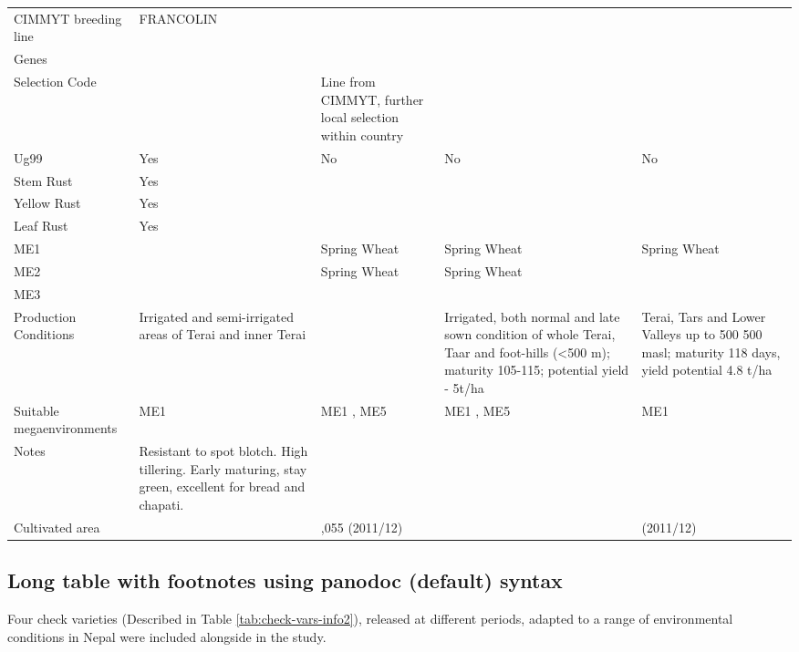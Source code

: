 \documentclass[]{article}
\begin{document}
\begin{longtable}[t]{>{\centering\arraybackslash}p{2.0cm}>{\centering\arraybackslash}p{3.4cm}>{\centering\arraybackslash}p{3.4cm}>{\centering\arraybackslash}p{3.4cm}>{\centering\arraybackslash}p{3.4cm}}
CIMMYT breeding line & FRANCOLIN &  &  & \\
Genes &  &  &  & \\
\addlinespace
Selection Code &  & Line from CIMMYT, further local selection within country &  & \\
Ug99 & Yes & No & No & No\\
Stem Rust & Yes &  &  & \\
Yellow Rust & Yes &  &  & \\
Leaf Rust & Yes &  &  & \\
\addlinespace
ME1 &  & Spring Wheat & Spring Wheat & Spring Wheat\\
ME2 &  & Spring Wheat & Spring Wheat & \\
ME3 &  &  &  & \\
Production Conditions & Irrigated and semi-irrigated areas of Terai and inner Terai &  & Irrigated, both normal and late sown condition of whole Terai, Taar and foot-hills (<500 m); maturity 105-115; potential yield - 5t/ha & Terai, Tars and Lower Valleys up to 500 500 masl; maturity 118 days, yield potential 4.8 t/ha\\
Suitable megaenvironments & ME1 & ME1 , ME5 & ME1 , ME5 & ME1\\
\addlinespace
Notes & Resistant to spot blotch. High tillering. Early maturing, stay green, excellent for bread and chapati. &  &  & \\
Cultivated area &  & 153,055 (2011/12) &  & 38263 (2011/12)\\
\bottomrule
\end{longtable}


\subsection{Long table with footnotes using panodoc (default)
syntax}\label{long-table-with-footnotes-using-panodoc-default-syntax}

Four check varieties (Described in Table \ref{tab:check-vars-info2}),
released at different periods, adapted to a range of environmental
conditions in Nepal were included alongside in the study.
\end{document}
